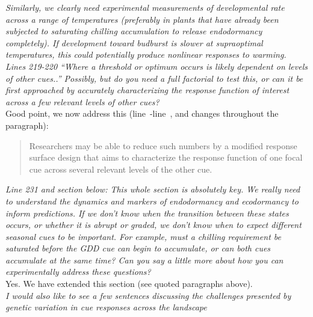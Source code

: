 \documentclass[11pt,letter]{article}
\newcommand{\lr}[1]{line~\lineref{#1}}
\begin{document}
\emph{Similarly, we clearly need experimental measurements of developmental rate across a range of temperatures (preferably in plants that have already been subjected to saturating chilling accumulation to release endodormancy completely).  If development toward budburst is slower at supraoptimal temperatures, this could potentially produce nonlinear responses to warming. }\\

\emph{Lines 219-220 “Where a threshold or optimum occurs is likely dependent on levels of other cues..”  Possibly, but do you need a full factorial to test this, or can it be first approached by accurately characterizing the response function of interest across a few relevant levels of other cues? }\\

Good point, we now address this (\lr{r2studydesignstart}-\lr{r2studydesignend}, and changes throughout the paragraph):
\begin{quote}
Researchers may be able to reduce such numbers by a modified response surface design that aims to characterize the response function of one focal cue across several relevant levels of the other cue.
\end{quote}

\emph{Line 231 and section below: This whole section is absolutely key.  We really need to understand the dynamics and markers of endodormancy and ecodormancy to inform predictions.  If we don’t know when the transition between these states occurs, or whether it is abrupt or graded, we don’t know when to expect different seasonal cues to be important.  For example, must a chilling requirement be saturated before the GDD cue can begin to accumulate, or can both cues accumulate at the same time? Can you say a little more about how you can experimentally address these questions? }\\

Yes. We have extended this section (see quoted paragraphs above).\\

\emph{I would also like to see a few sentences discussing the challenges presented by genetic variation in cue responses across the landscape }\\
\end{document}
